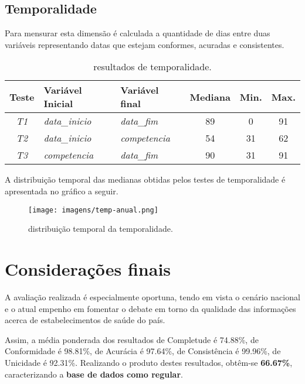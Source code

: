 \documentclass[
  12,
  table]{proadi}
\begin{document}
\hypertarget{temporalidade}{%
\subsection{Temporalidade}\label{temporalidade}}

Para mensurar esta dimensão é calculada a quantidade de dias entre duas
variáveis representando datas que estejam conformes, acuradas e
consistentes.

\begin{table}[H]

\caption{\label{tab:unnamed-chunk-20}resultados de temporalidade.}
\centering
\fontsize{10}{12}\selectfont
\begin{tabular}[t]{>{}c>{}l>{}lccc}
\toprule
Teste & Variável Inicial & Variável final & Mediana & Min. & Max.\\
\midrule
\em{T1} & \em{data\_inicio} & \em{data\_fim} & 89 & 0 & 91\\
\em{T2} & \em{data\_inicio} & \em{competencia} & 54 & 31 & 62\\
\em{T3} & \em{competencia} & \em{data\_fim} & 90 & 31 & 91\\
\bottomrule
\end{tabular}
\end{table}

A distribuição temporal das medianas obtidas pelos testes de
temporalidade é apresentada no gráfico a seguir.

\begin{figure}
\centering
\texttt{[image: imagens/temp-anual.png]}
\caption{distribuição temporal da temporalidade.}
\end{figure}

\hypertarget{considerauxe7uxf5es-finais}{%
\section{Considerações finais}\label{considerauxe7uxf5es-finais}}

A avaliação realizada é especialmente oportuna, tendo em vista o cenário
nacional e o atual empenho em fomentar o debate em torno da qualidade
das informações acerca de estabelecimentos de saúde do país.

Assim, a média ponderada dos resultados de Completude é 74.88\%, de
Conformidade é 98.81\%, de Acurácia é 97.64\%, de Consistência é
99.96\%, de Unicidade é 92.31\%. Realizando o produto destes resultados,
obtêm-se \textbf{66.67\%}, caracterizando a \textbf{base de dados como
regular}.
\end{document}
